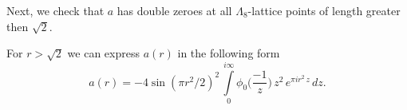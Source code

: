   Next, we check that $a$ has double zeroes at all $\Lambda_8$-lattice points of length greater then $\sqrt{2}$.

  \begin{proposition}\label{prop: a(r) double zeroes}
  For $r>\sqrt{2}$ we can express $a(r)$ in the following form
  \begin{equation}\label{eqn: a double zeroes}
    a(r)=-4\sin(\pi r^2/2)^2\,\int\limits_{0}^{i\infty}\phi_0\Big(\frac{-1}{z}\Big)\,z^2\,e^{\pi i r^2 \,z}\,dz.
  \end{equation}
  \end{proposition}
